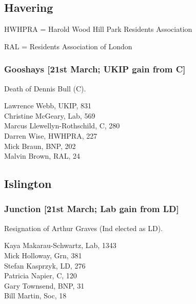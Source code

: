 \documentclass[a4paper,openany,10pt]{book}
\begin{document}
\subsection*{Havering}

HWHPRA = Harold Wood Hill Park Residents Association

RAL = Residents Association of London

\subsubsection*{Gooshays \hspace*{\fill}\nolinebreak[1]%
\enspace\hspace*{\fill}
[21st March; UKIP gain from C]}


Death of Dennis Bull (C).



Lawrence Webb, UKIP, 831\\
{Christine McGeary}, Lab, 569\\
Marcus Llewellyn-Rothschild, C, 280\\
Darren Wise, HWHPRA, 227\\
Mick Braun, BNP, 202\\
Malvin Brown, RAL, 24\\


\subsection*{Islington}

\subsubsection*{Junction \hspace*{\fill}\nolinebreak[1]%
\enspace\hspace*{\fill}
[21st March; Lab gain from LD]}


Resignation of Arthur Graves (Ind elected as LD).



{Kaya Makarau-Schwartz}, Lab, 1343\\
Mick Holloway, Grn, 381\\
Stefan Kasprzyk, LD, 276\\
Patricia Napier, C, 120\\
Gary Townsend, BNP, 31\\
Bill Martin, Soc, 18\\
\end{document}
